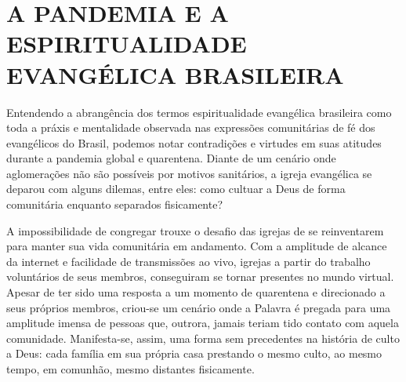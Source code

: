 \documentclass[
    article,            %
	12pt,				%
	oneside,			%
	a4paper,			%
	chapter=TITLE,		%
	section=TITLE,		%
	english,			%
	french,				%
	spanish,			%
	brazil				%
	]{abntex2}
\begin{document}



\imprimircapa

\imprimirfolhaderosto


\textual
\pagestyle{simple}




\section*{A PANDEMIA E A ESPIRITUALIDADE EVANGÉLICA BRASILEIRA}
Entendendo a abrangência dos termos espiritualidade evangélica brasileira como toda a práxis e mentalidade observada nas expressões comunitárias de fé dos evangélicos do Brasil, podemos notar contradições e virtudes em suas atitudes durante a pandemia global e quarentena. Diante de um cenário onde aglomerações não são possíveis por motivos sanitários, a igreja evangélica se deparou com alguns dilemas, entre eles: como cultuar a Deus de forma comunitária enquanto separados fisicamente?

A impossibilidade de congregar trouxe o desafio das igrejas de se reinventarem para manter sua vida comunitária em andamento. Com a amplitude de alcance da internet e facilidade de transmissões ao vivo, igrejas a partir do trabalho voluntários de seus membros, conseguiram se tornar presentes no mundo virtual. Apesar de ter sido uma resposta a um momento de quarentena e direcionado a seus próprios membros, criou-se um cenário onde a Palavra é pregada para uma amplitude imensa de pessoas que, outrora, jamais teriam tido contato com aquela comunidade. Manifesta-se, assim, uma forma sem precedentes na história de culto a Deus: cada família em sua própria casa prestando o mesmo culto, ao mesmo tempo, em comunhão, mesmo distantes fisicamente.
\end{document}

